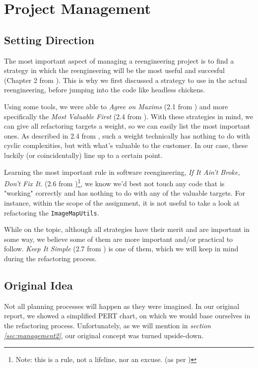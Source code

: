 \documentclass[11pt]{article}
\begin{document}
	\section{Project Management}
	\subsection{Setting Direction}
	The most important aspect of managing a reengineering project is to find a strategy in which the reengineering will be the most useful and succesful (Chapter 2 from \cite{demeyer2009object}). This is why we first discussed a strategy to use in the actual reengineering, before jumping into the code like headless chickens.
	
	Using some tools, we were able to \textsl{Agree on Maxims} (2.1 from \cite{demeyer2009object}) and more specifically the \textsl{Most Valuable First} (2.4 from \cite{demeyer2009object}). With these strategies in mind, we can give all refactoring targets a weight, so we can easily list the most important ones. As described in 2.4 from \cite{demeyer2009object}, such a weight technically has nothing to do with cyclic complexities, but with what's valuable to the customer. In our case, these luckily (or coincidentally) line up to a certain point.
	
	Learning the most important rule in software reengineering,
	\textsl{If It Ain't Broke, Don't Fix It.} (2.6 from \cite{demeyer2009object})\footnote{Note: this is a rule, not a lifeline, nor an excuse. (as per \cite{demeyer2009object})}, we know we'd best not touch any code that is "working" correctly and has nothing to do with any of the valuable targets. For instance, within the scope of the assignment, it is not useful to take a look at refactoring the \texttt{ImageMapUtils}.
	
	While on the topic, although all strategies have their merit and are important in some way, we believe some of them are more important and/or practical to follow. \textsl{Keep It Simple} (2.7 from \cite{demeyer2009object}) is one of them, which we will keep in mind during the refactoring process.
	
	\subsection{Original Idea}
	\label{sec:original}
	Not all planning processes will happen as they were imagined. In our original report, we showed a simplified \textsf{PERT} chart, on which we would base ourselves in the refactoring process. Unfortunately, as we will mention in \textsl{section \ref{sec:management2}}, our original concept was turned upside-down.
	
\end{document}
